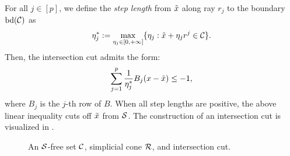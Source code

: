     
For all $j \in [p]$, we define the \textit{step length} from $\tilde{x}$ along ray $r_j$ to the boundary  $\operatorname{bd}(\mathcal C)$ as
\begin{equation}
 \label{eq.iccoef}
   \eta_j^\ast := \max_{\eta_j \in [0,+\infty]}\{\eta_j: \tilde{x} + \eta_j r^j \in \mathcal C\}.
\end{equation}
Then, the intersection cut admits the form:
\begin{equation}
 \label{eq.ic}
     \sum_{j =1}^{p} \frac{1}{\eta_j^\ast} B_j (x - \tilde{x}) \le -1,
 \end{equation}
where $B_j$ is the $j$-th row of $B$. When all step lengths are positive, the above linear inequality cuts off $\tilde{x}$ from $\mathcal S$.   The construction of an intersection cut is visualized in .

\begin{figure}
    \centering
     \hfill
     \hfill
     \caption{An $\mathcal S$-free set $\mathcal C$, simplicial cone $\mathcal R$, and intersection cut.}
     \label{fig.sdef}
   \end{figure}

